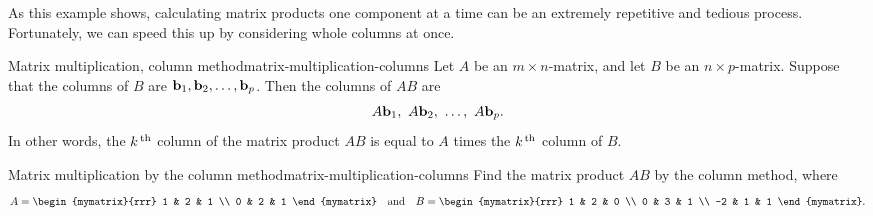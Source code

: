 As this example shows, calculating matrix products one component at a
time can be an extremely repetitive and tedious process. Fortunately,
we can speed this up by considering whole columns at once.

\begin{proposition}{Matrix multiplication, column method}{matrix-multiplication-columns}
  Let $A$ be an $m\times n$-matrix, and let $B$ be an
  $n\times p$-matrix.  Suppose that the columns of $B$ are
  $\mbox{\bf b}_1,\mbox{\bf b}_2,\ldots,\mbox{\bf b}_p$. Then the columns of $AB$
  are%
  \begin{equation*}
    A\mbox{\bf b}_1,~A\mbox{\bf b}_2,~\ldots,~A\mbox{\bf b}_p.
  \end{equation*}
  In other words, the $k^{\,\rm th}$ column of the matrix product $AB$ is
  equal to $A$ times the $k^{\,\rm th}$ column of $B$.
\end{proposition}

\begin{example}{Matrix multiplication by the column method}{matrix-multiplication-columns}
  Find the matrix product $AB$ by the column method, where
  \begin{equation*}
    A = \begin{mymatrix}{rrr}
      1 & 2 & 1 \\
      0 & 2 & 1
    \end{mymatrix}
    \quad\mbox{and}\quad
    B = \begin{mymatrix}{rrr}
      1 & 2 & 0 \\
      0 & 3 & 1 \\
      -2 & 1 & 1
    \end{mymatrix}.
  \end{equation*}
\end{example}

